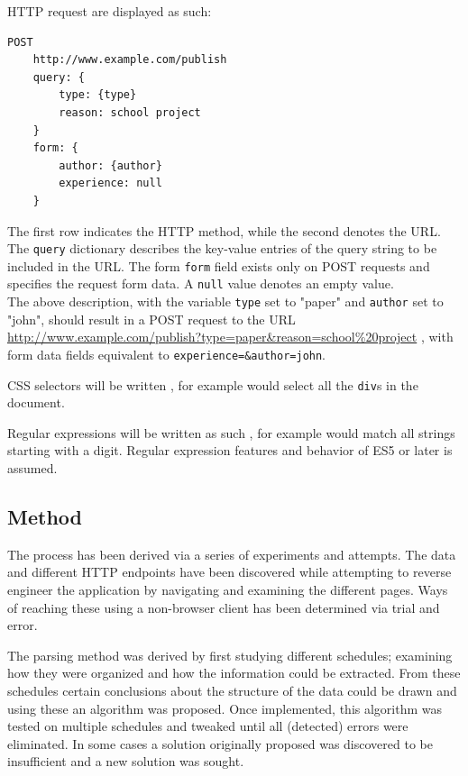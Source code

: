 \documentclass{article}
\begin{document}
	HTTP request are displayed as such:
	
	\newpage
	\begin{lstlisting}[language=HTTP, style=nonumbers]
	POST
	http://www.example.com/publish
	query: {
		type: {type}
		reason: school project
	}
	form: {
		author: {author}
		experience: null
	}
	\end{lstlisting}
	The first row indicates the HTTP method, while the second denotes the URL. The \texttt{query} dictionary describes the key-value entries of the query string to be included in the URL. The form \texttt{form} field exists only on POST requests and specifies the request form data. A \texttt{null} value denotes an empty value.\\
	The above description, with the variable \texttt{type} set to "paper" and \texttt{author} set to "john", should result in a POST request to the URL \url{http://www.example.com/publish?type=paper&reason=school%20project}%
	, with form data fields equivalent to \texttt{experience=\&author=john}.
	
	CSS selectors will be written , for example  would select all the \texttt{div}s in the document.
	
	Regular expressions will be written as such , for example \regex{^\d} would match all strings starting with a digit. Regular expression features and behavior of ES5 or later is assumed.
	
	\subsection{Method}
	The process has been derived via a series of experiments and attempts. The data and different HTTP endpoints have been discovered while attempting to reverse engineer the application by navigating and examining the different pages. Ways of reaching these using a non-browser client has been determined via trial and error.
	
	The parsing method was derived by first studying different schedules; examining how they were organized and how the information could be extracted. From these schedules certain conclusions about the structure of the data could be drawn and using these an algorithm was proposed. Once implemented, this algorithm was tested on multiple schedules and tweaked until all (detected) errors were eliminated. In some cases a solution originally proposed was discovered to be insufficient and a new solution was sought.
	
\end{document}
